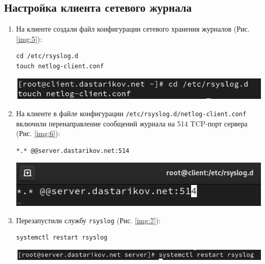 \subsection{Настройка клиента сетевого журнала}
\begin{enumerate}
\item На клиенте создали файл конфигурации сетевого хранения журналов (Рис. \ref{img:5}):
    \begin{verbatim}
cd /etc/rsyslog.d
touch netlog-client.conf
    \end{verbatim}

\begin{center}
    \centering
    \includegraphics[width=\textwidth]{../images/image05.png}
    \label{img:5}
\end{center}

\item На клиенте в файле конфигурации {\tt /etc/rsyslog.d/netlog-client.conf} включили перенаправление сообщений журнала на 514 TCP-порт сервера (Рис. \ref{img:6}):
    \begin{verbatim}
*.* @@server.dastarikov.net:514
    \end{verbatim}

\begin{center}
    \centering
    \includegraphics[width=\textwidth]{../images/image06.png}
    \label{img:6}
\end{center}

\item Перезапустили службу {\tt rsyslog} (Рис. \ref{img:7}):
    \begin{verbatim}
systemctl restart rsyslog
    \end{verbatim}


\begin{center}
    \centering
    \includegraphics[width=\textwidth]{../images/image07.png}
    \label{img:7}
\end{center}
\end{enumerate}

